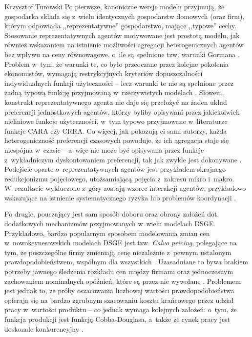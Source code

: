 \begin{artplenv}{Krzysztof Turowski}
Po pierwsze, kanoniczne wersje modelu przyjmują, że gospodarka składa się z~wielu identycznych gospodarstw domowych
(oraz firm), którym odpowiada ,,reprezentatywne'' gospodarstwo, mające ,,typowe'' cechy. Stosowanie reprezentatywnych
agentów motywowane jest prostotą modelu, jak również wskazaniem na istnienie możliwości agregacji heterogenicznych
agentów bez wpływu na ceny równowagowe, o~ile są spełnione tzw. warunki Gormana
\parencite{eichenbaum_estimating_1990}.
Problem w~tym, że warunki te, co było przeoczane przez kolejne pokolenia ekonomistów, wymagają
restrykcyjnych kryteriów dopuszczalności indywidualnych funkcji użyteczności  --  lecz warunki te nie są
spełnione przez żadną typową funkcję przyjmowaną w~rzeczywistych modelach
\parencite{jackson_non-existence_2017}.
Słowem, konstrukt reprezentatywnego agenta nie daje się przełożyć na żaden układ preferencji jednostkowych
agentów, którzy byliby opisywani przez jakiekolwiek nieliniowe funkcje użyteczności, w~tym typowo
przyjmowane w~literaturze funkcje CARA czy CRRA. Co więcej, jak pokazują ci sami autorzy, każda heterogeniczność preferencji
czasowych powoduje, że ich agregacja staje się niespójna w~czasie  --  a~więc nie może być opisywana przez
funkcje z~wykładniczym dyskontowaniem preferencji, tak jak zwykle jest dokonywane
\parencite{jackson_collective_2015}.
Podejście oparte o~reprezentatywnych agentów jest przykładem skrajnego redukcjonizmu pojęciowego,
utożsamiającą pojęcia z~zakresu mikro i~makro. W~rezultacie wykluczone z~góry zostają wzorce interakcji agentów,
przykładowo wskazujące na istnienie systematycznego ryzyka lub problemów koordynacji
\parencite{colander_financial_2009}.

Po drugie, pouczający jest sam sposób doboru oraz obrony założeń dot. dodatkowych mechanizmów przyjmowanych w~wielu
modelach DSGE. Przykładowo, bardzo popularnym sposobem modelowania zmian cen w~nowokeynesowskich modelach DSGE jest
tzw. \textit{Calvo pricing}, polegające na tym, że poszczególne firmy zmieniają cenę niezależnie z~pewnym ustalonym
prawdopodobieństwem, wspólnym dla wszystkich
\parencite{calvo_staggered_1983}.
Uzasadniane to bywa brakiem
potrzeby jawnego śledzenia rozkładu cen między firmami oraz jednoczesnym zachowaniem nominalnych opóźnień, które są
przez nie wywołane
\parencite{christiano_nominal_2005}.
Problemem jest jednak to, że próby oszacowania
liczbowej wartości prawdopodobieństwa opierają się na bardzo zgrubnym szacowaniu kosztu krańcowego przez udział
pracy w~wartości produktu  --  co jednak wymaga kolejnych założeń: o~tym, że funkcja produkcji jest funkcją
Cobba-Douglasa, a~także że rynek pracy jest doskonale konkurencyjny
\parencite{wolman_sticky_1999}.


\end{artplenv}

